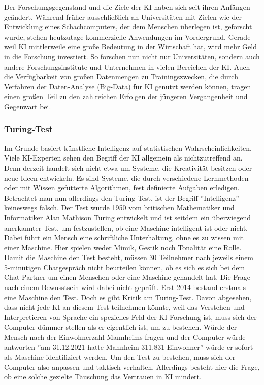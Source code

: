 \documentclass[a4paper,12pt, german]{report}
\begin{document}
Der Forschungsgegenstand und die Ziele der KI haben sich seit ihren Anfängen geändert. Während früher ausschließlich an Universitäten mit Zielen wie der Entwicklung eines Schachcomputers, der dem Menschen überlegen ist, geforscht wurde, stehen heutzutage kommerzielle Anwendungen im Vordergrund. 
Gerade weil KI mittlerweile eine große Bedeutung in der Wirtschaft hat, wird mehr Geld in die Forschung investiert. So forschen nun nicht nur Universitäten, sondern auch andere Forschungsinstitute und Unternehmen in vielen Bereichen der KI. Auch die Verfügbarkeit von großen Datenmengen zu Trainingszwecken, die durch Verfahren der Daten-Analyse (Big-Data) für KI genutzt werden können, tragen einen großen Teil zu den zahlreichen Erfolgen der jüngeren Vergangenheit und Gegenwart bei.\cite{10}

\subsubsection{Turing-Test}

Im Grunde basiert künstliche Intelligenz auf statistischen Wahrscheinlichkeiten. Viele KI-Experten sehen den Begriff der KI allgemein als nichtzutreffend an. Denn derzeit handelt sich nicht etwa um Systeme, die Kreativität besitzen oder neue Ideen entwickeln. Es sind Systeme, die durch verschiedene Lernmethoden oder mit Wissen gefütterte Algorithmen, fest definierte Aufgaben erledigen. \newline
Betrachtet man nun allerdings den Turing-Test, ist der Begriff ''Intelligenz'' keineswegs falsch. Der Test wurde 1950 vom britischen Mathematiker und Informatiker Alan Mathison Turing entwickelt und ist seitdem ein überwiegend anerkannter Test, um festzustellen, ob eine Maschine intelligent ist oder nicht.
Dabei führt ein Mensch eine schriftliche Unterhaltung, ohne es zu wissen mit einer Maschine. Hier spielen weder Mimik, Gestik noch Tonalität eine Rolle. Damit die Maschine den Test besteht, müssen 30 Teilnehmer nach jeweils einem 5-minütigen Chatgespräch nicht beurteilen können, ob es sich es sich bei dem Chat-Partner um einen Menschen oder eine Maschine gehandelt hat. Die Frage nach einem Bewusstsein wird dabei nicht geprüft. Erst 2014 bestand erstmals eine Maschine den Test. \newline
Doch es gibt Kritik am Turing-Test. Davon abgesehen, dass nicht jede KI an diesem Test teilnehmen könnte, weil das Verstehen und Interpretieren von Sprache ein spezielles Feld der KI-Forschung ist, muss sich der Computer dümmer stellen als er eigentlich ist, um zu bestehen. Würde der Mensch nach der Einwohnerzahl Mannheims fragen und der Computer würde antworten ''am 31.12.2021 hatte Mannheim 311.831 Einwohner'' würde er sofort als Maschine identifiziert werden. Um den Test zu bestehen, muss sich der Computer also anpassen und taktisch verhalten. Allerdings besteht hier die Frage, ob eine solche gezielte Täuschung das Vertrauen in KI mindert.\cite{02}
\end{document}
